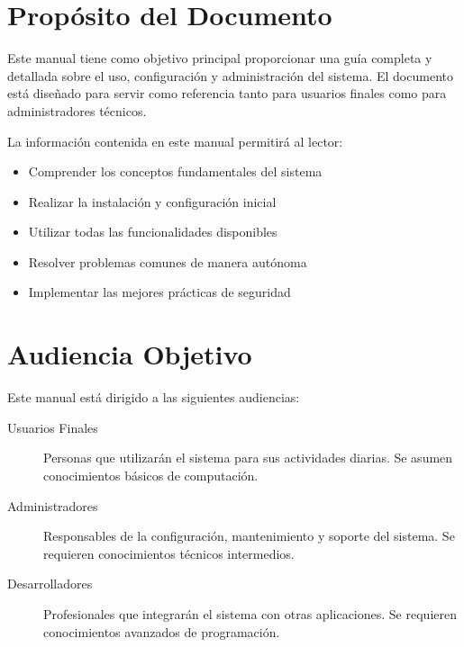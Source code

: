 

\section{Propósito del Documento}

Este manual tiene como objetivo principal proporcionar una guía completa y detallada sobre el uso, configuración y administración del sistema. El documento está diseñado para servir como referencia tanto para usuarios finales como para administradores técnicos.

La información contenida en este manual permitirá al lector:
\begin{itemize}
    \item Comprender los conceptos fundamentales del sistema
    \item Realizar la instalación y configuración inicial
    \item Utilizar todas las funcionalidades disponibles
    \item Resolver problemas comunes de manera autónoma
    \item Implementar las mejores prácticas de seguridad
\end{itemize}

\section{Audiencia Objetivo}

Este manual está dirigido a las siguientes audiencias:

\begin{description}
    \item[Usuarios Finales] Personas que utilizarán el sistema para sus actividades diarias. Se asumen conocimientos básicos de computación.
    
    \item[Administradores] Responsables de la configuración, mantenimiento y soporte del sistema. Se requieren conocimientos técnicos intermedios.
    
    \item[Desarrolladores] Profesionales que integrarán el sistema con otras aplicaciones. Se requieren conocimientos avanzados de programación.
\end{description}

